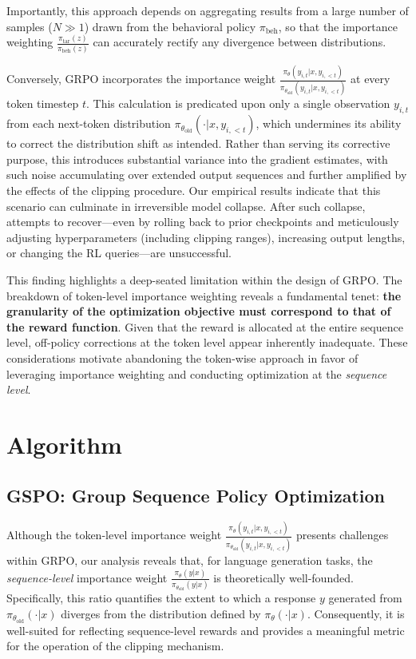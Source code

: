 Importantly, this approach depends on aggregating results from a large number of samples ($N \gg 1$) drawn from the behavioral policy $\pi_\text{beh}$, so that the importance weighting $\frac{ \pi_\text{tar} (z) }{ \pi_\text{beh} (z)}$ can accurately rectify any divergence between distributions.

Conversely, GRPO incorporates the importance weight $\frac{ \pi_{\theta} (y_{i,t} | x, y_{i,<t}) }{ \pi_{\theta_\text{old}} (y_{i,t} | x,y_{i,<t})}$ at every token timestep $t$. This calculation is predicated upon only a single observation $y_{i,t}$ from each next-token distribution $\pi_{\theta_\text{old}}( \cdot | x, y_{i, <t})$, which undermines its ability to correct the distribution shift as intended. Rather than serving its corrective purpose, this introduces substantial variance into the gradient estimates, with such noise accumulating over extended output sequences and further amplified by the effects of the clipping procedure. Our empirical results indicate that this scenario can culminate in irreversible model collapse. After such collapse, attempts to recover—even by rolling back to prior checkpoints and meticulously adjusting hyperparameters (including clipping ranges), increasing output lengths, or changing the RL queries—are unsuccessful.

This finding highlights a deep-seated limitation within the design of GRPO. The breakdown of token-level importance weighting reveals a fundamental tenet: \textbf{the granularity of the optimization objective must correspond to that of the reward function}. Given that the reward is allocated at the entire sequence level, off-policy corrections at the token level appear inherently inadequate. These considerations motivate abandoning the token-wise approach in favor of leveraging importance weighting and conducting optimization at the \textit{sequence level}.

\section{Algorithm}

\subsection{GSPO: Group Sequence Policy Optimization}

Although the token-level importance weight $\frac{ \pi_{\theta} (y_{i,t} | x, y_{i,<t}) }{ \pi_{\theta_\text{old}} (y_{i,t} | x,y_{i,<t})}$ presents challenges within GRPO, our analysis reveals that, for language generation tasks, the \textit{sequence-level} importance weight $\frac{ \pi_{\theta} (y | x) }{ \pi_{\theta_\text{old}} (y | x)}$ is theoretically well-founded. Specifically, this ratio quantifies the extent to which a response $y$ generated from $\pi_{\theta_\text{old}} (\cdot | x)$ diverges from the distribution defined by $\pi_{\theta} (\cdot | x)$. Consequently, it is well-suited for reflecting sequence-level rewards and provides a meaningful metric for the operation of the clipping mechanism.

